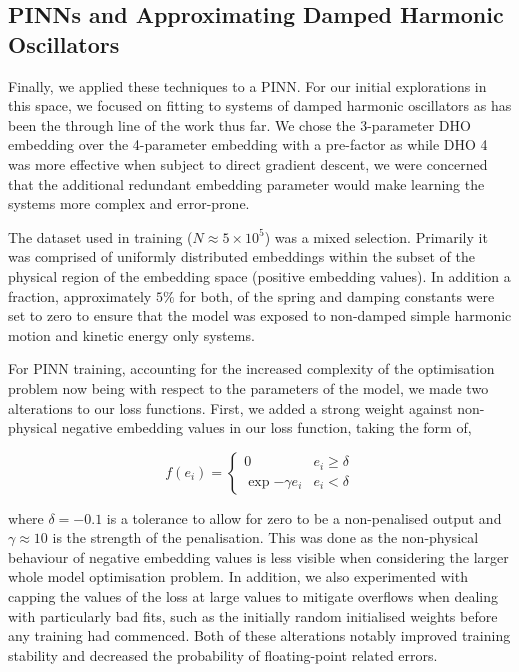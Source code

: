 \subsection{PINNs and Approximating Damped Harmonic Oscillators}

Finally, we applied these techniques to a PINN. For our initial explorations in this space, we focused on fitting to systems of damped harmonic oscillators as has been the through line of the work thus far. We chose the 3-parameter DHO embedding over the 4-parameter embedding with a pre-factor as while DHO 4 was more effective when subject to direct gradient descent, we were concerned that the additional redundant embedding parameter would make learning the systems more complex and error-prone.

The dataset used in training ($N \approx 5 \times 10^5$) was a mixed selection. Primarily it was comprised of uniformly distributed embeddings within the subset of the physical region of the embedding space (positive embedding values). In addition a fraction, approximately $5 \%$ for both, of the spring and damping constants were set to zero to ensure that the model was exposed to non-damped simple harmonic motion and kinetic energy only systems.

For PINN training, accounting for the increased complexity of the optimisation problem now being with respect to the parameters of the model, we made two alterations to our loss functions. First, we added a strong weight against non-physical negative embedding values in our loss function, taking the form of,

\begin{equation}
  f(e_i) = \begin{cases}
  	0 & e_i \ge \delta \\
  	\exp{-\gamma e_i} & e_i < \delta 
  \end{cases}
\end{equation}

where $\delta = −0.1$ is a tolerance to allow for zero to be a non-penalised output and $\gamma \approx 10$ is the strength of the penalisation. This was done as the non-physical behaviour of negative embedding values is less visible when considering the larger whole model optimisation problem.
In addition, we also experimented with capping the values of the loss at large values to mitigate overflows when dealing with particularly bad fits, such as the initially random initialised weights before any training had commenced. Both of these alterations notably improved training stability and decreased the probability of floating-point related errors.

